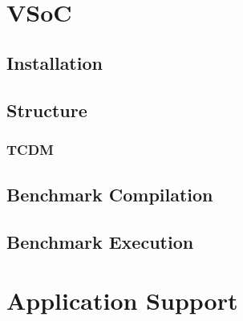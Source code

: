 \documentclass{article}
\title{
\vspace{2in}
\textmd{\textbf{\hmwkClass}}\\
\textmd{\textbf{\hmwkTitle}}\\
\normalsize\vspace{0.1in}\small{\hmwkDueDate}\\
\vspace{0.1in}\large{\textit{\hmwkClassInstructor}}
\vspace{3in}
}
\author{\textbf{\hmwkAuthorName}}
\date{}
\begin{document}
\maketitle


\setcounter{tocdepth}{3} %

\newpage
\tableofcontents
\newpage




\section{VSoC}

\subsection{Installation}
\subsection{Structure}
\subsubsection{TCDM}

\subsection{Benchmark Compilation}
\subsection{Benchmark Execution}


\section{Application Support}
\end{document}
